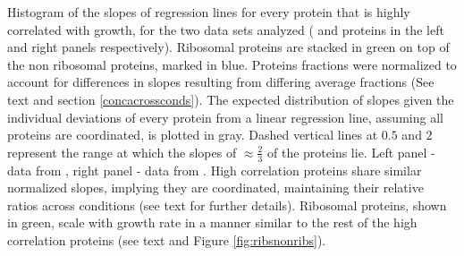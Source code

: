 \label{fig:globalfit}
    Histogram of the slopes of regression lines for every protein that is highly correlated with growth, for the two data sets analyzed (\hGlobal{} and \vGlobal{} proteins in the left and right panels respectively).
    Ribosomal proteins are stacked in green on top of the non ribosomal proteins, marked in blue.
    Proteins fractions were normalized to account for differences in slopes resulting from differing average fractions (See text and section \ref{concacrossconds}).
    The expected distribution of slopes given the individual deviations of every protein from a linear regression line, assuming all proteins are coordinated, is plotted in gray.
    Dashed vertical lines at $0.5$ and $2$ represent the range at which the slopes of $\approx \frac{2}{3}$ of the proteins lie.
    Left panel - data from \cite{Heinemann2015}, right panel - data from \cite{Peebo_2015}.
    High correlation proteins share similar normalized slopes, implying they are coordinated, maintaining their relative ratios across conditions (see text for further details).
    Ribosomal proteins, shown in green, scale with growth rate in a manner similar to the rest of the high correlation proteins (see text and Figure \ref{fig:ribsnonribs}).

